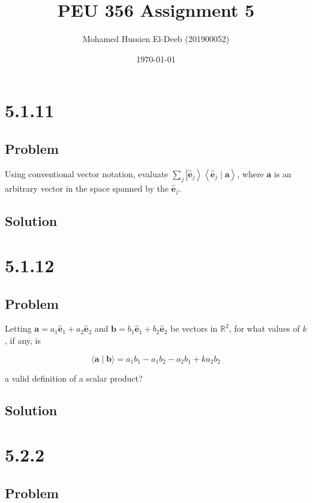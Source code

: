 \documentclass[12pt]{article}
\title{PEU 356 Assignment 5}
\author{Mohamed Hussien El-Deeb (201900052)}
\date{\today}
\begin{document}
\maketitle
\tableofcontents
\hypersetup{linkcolor=RoyalBlue4}

\newpage
\section{5.1.11}

\subsection{Problem}

Using conventional vector notation, evaluate \(\sum_j\left|\hat{\mathbf{e}}_j\right\rangle\left\langle\hat{\mathbf{e}}_j \mid \mathbf{a}\right\rangle \), where \(\mathbf{a}\) is an arbitrary vector in the space spanned by the \(\hat{\mathbf{e}}_j\).

\subsection{Solution}

\newpage
\section{5.1.12}

\subsection{Problem}

Letting \(\mathbf{a}=a_1 \hat{\mathbf{e}}_1+a_2 \hat{\mathbf{e}}_2\) and \(\mathbf{b}=b_1 \hat{\mathbf{e}}_1+b_2 \hat{\mathbf{e}}_2\) be vectors in \(\mathbb{R}^2\), for what values of \(k\), if any, is

\[
    \langle\mathbf{a} \mid \mathbf{b}\rangle=a_1 b_1-a_1 b_2-a_2 b_1+k a_2 b_2
\]

a valid definition of a scalar product?

\subsection{Solution}

\newpage
\section{5.2.2}

\subsection{Problem}
\end{document}
